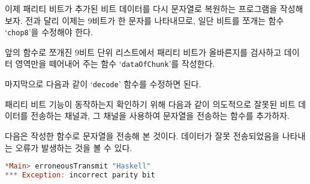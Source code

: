 이제 패리티 비트가 추가된 비트 데이터를 다시 문자열로 복원하는 프로그램을
작성해 보자. 전과 달리 이제는 9비트가 한 문자를 나타내므로, 일단 비트를 쪼개는
함수 `\texttt{chop8}'을 수정해야 한다.

앞의 함수로 쪼개진 9비트 단위 리스트에서 패리티 비트가 올바른지를 검사하고
데이터 영역만을 떼어내어 주는 함수 `\texttt{dataOfChunk}'를 작성한다.

마지막으로 다음과 같이 `\texttt{decode}' 함수를 수정하면 된다.


패리티 비트 기능이 동작하는지 확인하기 위해 다음과 같이 의도적으로 잘못된 비트
데이터를 전송하는 채널과, 그 채널을 사용하여 문자열을 전송하는 함수를 추가하자.

다음은 작성한 함수로 문자열을 전송해 본 것이다. 데이터가 잘못 전송되었음을
나타내는 오류가 발생하는 것을 볼 수 있다.
\begin{lstlisting}[language=Haskell]
*Main> erroneousTransmit "Haskell"
*** Exception: incorrect parity bit
\end{lstlisting}



